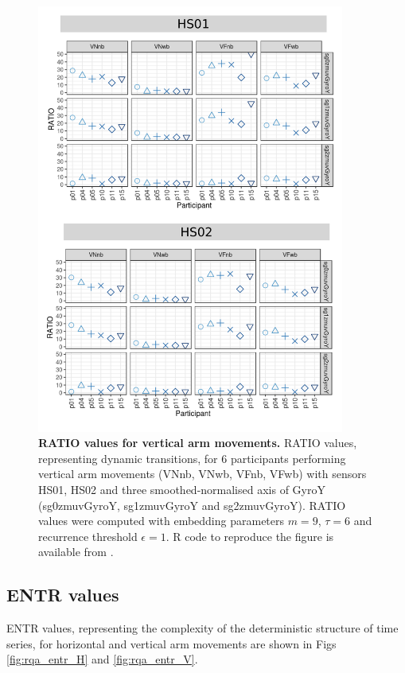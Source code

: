 \begin{figure}[!h]
\centering
\includegraphics[width=0.9\textwidth]{rqa_ratio_V_w500}
    \caption{
	{\bf RATIO values for vertical arm movements.}	
	RATIO values, representing dynamic transitions, 
	for 6 participants performing vertical arm movements 
	(VNnb, VNwb, VFnb, VFwb)
	with sensors HS01, HS02 and three smoothed-normalised axis 
	of GyroY (sg0zmuvGyroY, sg1zmuvGyroY and sg2zmuvGyroY).
	RATIO values were computed with 
	embedding parameters $m=9$, $\tau=6$ and recurrence threshold
	$\epsilon=1$.
	R code to reproduce the figure is available from \cite{hwum2018}.
        }
    \label{fig:rqa_ratio_V}
\end{figure}



\subsection{ENTR values}
ENTR values, representing the complexity of the deterministic structure 
of time series, for horizontal and vertical arm movements are shown 
in Figs \ref{fig:rqa_entr_H} and \ref{fig:rqa_entr_V}.

